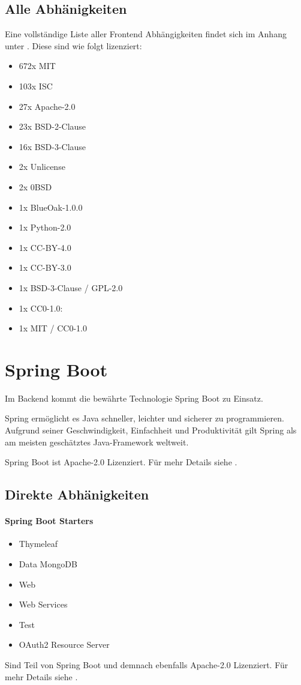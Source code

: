 \subsection{Alle Abhänigkeiten}
Eine vollständige Liste aller Frontend Abhängigkeiten findet sich im Anhang unter .
Diese sind wie folgt lizenziert:
\begin{itemize}
    \item 672x MIT
    \item 103x ISC
    \item 27x Apache-2.0
    \item 23x BSD-2-Clause
    \item 16x BSD-3-Clause
    \item 2x Unlicense
    \item 2x 0BSD
    \item 1x BlueOak-1.0.0
    \item 1x Python-2.0
    \item 1x CC-BY-4.0
    \item 1x CC-BY-3.0
    \item 1x BSD-3-Clause / GPL-2.0
    \item 1x CC0-1.0:
    \item 1x MIT / CC0-1.0
\end{itemize}



\section{Spring Boot}\label{sec:spring-boot}

Im Backend kommt die bewährte Technologie Spring Boot zu Einsatz.

Spring ermöglicht es Java schneller, leichter und sicherer zu programmieren.
Aufgrund seiner Geschwindigkeit, Einfachheit und Produktivität gilt Spring als am meisten geschätztes Java-Framework weltweit.
\cite{about-springboot}

Spring Boot ist Apache-2.0 Lizenziert.
Für mehr Details siehe .

\subsection{Direkte Abhänigkeiten}

\paragraph{Spring Boot Starters}
\begin{itemize}
    \item Thymeleaf
    \item Data MongoDB
    \item Web
    \item Web Services
    \item Test
    \item OAuth2 Resource Server
\end{itemize}
Sind Teil von Spring Boot und demnach ebenfalls Apache-2.0 Lizenziert.
Für mehr Details siehe .

